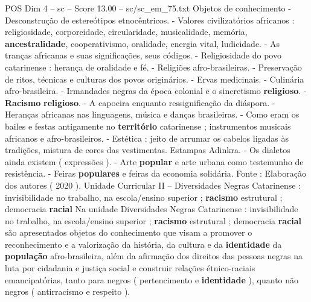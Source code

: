 \begin{textsample}{POS Dim 4 – sc – Score 13.00 – sc/sc\_em\_75.txt}
Objetos de conhecimento - Desconstrução de estereótipos etnocêntricos. - Valores civilizatórios africanos : religiosidade, corporeidade, circularidade, musicalidade, memória, \textbf{ancestralidade}, cooperativismo, oralidade, energia vital, ludicidade. - As tranças africanas e suas significações, seus códigos. - Religiosidade do povo catarinense : herança de oralidade e fé. - Religiões afro-brasileiras. - Preservação de ritos, técnicas e culturas dos povos originários. - Ervas medicinais. - Culinária afro-brasileira. - Irmandades negras da época colonial e o sincretismo \textbf{religioso}. - \textbf{Racismo} \textbf{religioso}. - A capoeira enquanto ressignificação da diáspora. - Heranças africanas nas linguagens, música e danças brasileiras. - Como eram os bailes e festas antigamente no \textbf{território} catarinense ; instrumentos musicais africanos e afro-brasileiros. - Estética : jeito de arrumar os cabelos ligadas às tradições, mistura de cores das vestimentas.
Estampas Adinkra. - Os dialetos ainda existem ( expressões ). - Arte \textbf{popular} e arte urbana como testemunho de resistência. - Feiras \textbf{populares} e feiras da economia solidária.
Fonte : Elaboração dos autores ( 2020 ).
Unidade Curricular II – Diversidades Negras Catarinense : invisibilidade no trabalho, na escola/ensino superior ; \textbf{racismo} estrutural ; democracia \textbf{racial} Na unidade Diversidades Negras Catarinense : invisibilidade no trabalho, na escola/ensino superior ; \textbf{racismo} estrutural ; democracia \textbf{racial} são apresentados objetos do conhecimento que visam a promover o reconhecimento e a valorização da história, da cultura e da \textbf{identidade} da \textbf{população} afro-brasileira, além da afirmação dos direitos das pessoas negras na luta por cidadania e justiça social e construir relações étnico-raciais emancipatórias, tanto para negros ( pertencimento e \textbf{identidade} ), quanto não negros ( antirracismo e respeito ).

\end{textsample}
